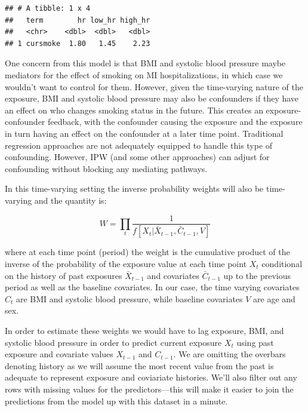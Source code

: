 \documentclass[
]{book}
\begin{document}
\begin{verbatim}
## # A tibble: 1 x 4
##   term        hr low_hr high_hr
##   <chr>    <dbl>  <dbl>   <dbl>
## 1 cursmoke  1.80   1.45    2.23
\end{verbatim}

One concern from this model is that BMI and systolic blood pressure maybe mediators for the effect of smoking on MI hospitalizations, in which case we wouldn't want to control for them. However, given the time-varying nature of the exposure, BMI and systolic blood pressure may also be confounders if they have an effect on who changes smoking status in the future. This creates an exposure-confounder feedback, with the confounder causing the exposure and the exposure in turn having an effect on the confounder at a later time point. Traditional regression approaches are not adequately equipped to handle this type of confounding. However, IPW (and some other approaches) can adjust for confounding without blocking any mediating pathways.

In this time-varying setting the inverse probability weights will also be time-varying and the quantity is:

\[
W=\prod_{t}\frac{1}{f[X_{t}|\bar{X}_{t-1},\bar{C}_{t-1},V]}
\]

where at each time point (period) the weight is the cumulative product of the inverse of the probability of the exposure value at each time point \(X_{t}\) conditional on the history of past exposures \(\bar{X}_{t-1}\) and covariates \(\bar{C}_{t-1}\) up to the previous period as well as the baseline covariates. In our case, the time varying covariates \(C_{t}\) are BMI and systolic blood pressure, while baseline covariates \(V\) are age and sex.

In order to estimate these weights we would have to lag exposure, BMI, and systolic blood pressure in order to predict current exposure \(X_{t}\) using past exposure and covariate values \(X_{t-1}\) and \(C_{t-1}\). We are omitting the overbars denoting history as we will assume the most recent value from the past is adequate to represent exposure and coviariate histories. We'll also filter out any rows with missing values for the predictors---this will make it easier to join the predictions from the model up with this dataset in a minute.
\end{document}
